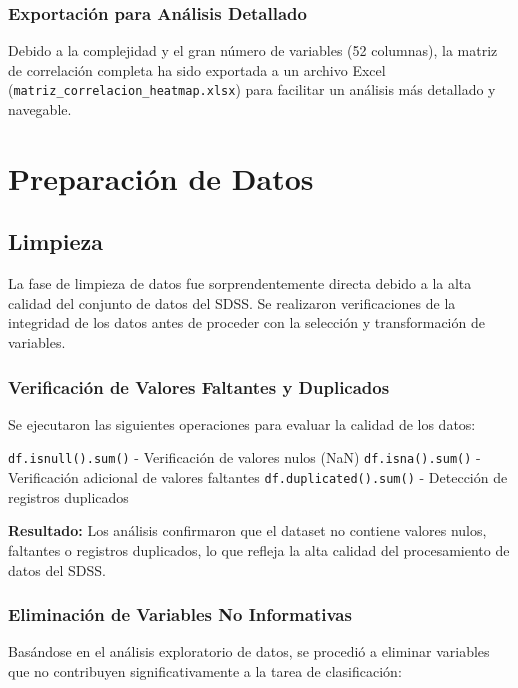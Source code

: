 \documentclass{article}
\begin{document}
\subsubsection{Exportación para Análisis Detallado}

Debido a la complejidad y el gran número de variables (52 columnas), la matriz de correlación completa ha sido exportada a un archivo Excel (\texttt{matriz\_correlacion\_heatmap.xlsx}) para facilitar un análisis más detallado y navegable.


\newpage

\section{Preparación de Datos}

\subsection{Limpieza}

La fase de limpieza de datos fue sorprendentemente directa debido a la alta calidad del conjunto de datos del SDSS. Se realizaron verificaciones de la integridad de los datos antes de proceder con la selección y transformación de variables.

\subsubsection{Verificación de Valores Faltantes y Duplicados}

Se ejecutaron las siguientes operaciones para evaluar la calidad de los datos:

\texttt{df.isnull().sum()} - Verificación de valores nulos (NaN)
\texttt{df.isna().sum()} - Verificación adicional de valores faltantes
\texttt{df.duplicated().sum()} - Detección de registros duplicados

\textbf{Resultado:} Los análisis confirmaron que el dataset no contiene valores nulos, faltantes o registros duplicados, lo que refleja la alta calidad del procesamiento de datos del SDSS.

\subsubsection{Eliminación de Variables No Informativas}

Basándose en el análisis exploratorio de datos, se procedió a eliminar variables que no contribuyen significativamente a la tarea de clasificación:
\end{document}
